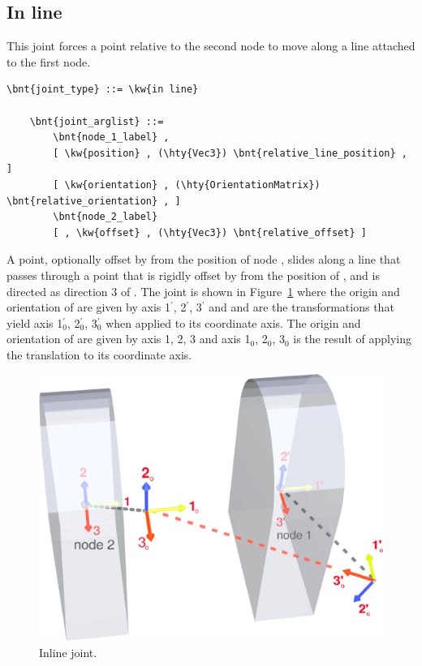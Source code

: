 \subsection{In line}
This joint forces a point relative to the second node to move 
along a line attached to the first node.
\begin{Verbatim}[commandchars=\\\{\}]
    \bnt{joint_type} ::= \kw{in line}

    \bnt{joint_arglist} ::= 
        \bnt{node_1_label} , 
        [ \kw{position} , (\hty{Vec3}) \bnt{relative_line_position} , ]
        [ \kw{orientation} , (\hty{OrientationMatrix}) \bnt{relative_orientation} , ]
        \bnt{node_2_label}
        [ , \kw{offset} , (\hty{Vec3}) \bnt{relative_offset} ]
\end{Verbatim}
A point, optionally offset by  from the position
of node , slides along a line that passes through a point 
that is rigidly offset by 
from the position of , and is directed as direction 3 
of .
The joint is shown in Figure~\ref{fig:el:joint:INLINE} where the origin and orientation of  are given by axis 1$^\prime$, 2$^\prime$, 3$^\prime$ and  and  are the transformations that yield axis 1$^\prime_0$, 2$^\prime_0$, 3$^\prime_0$ when applied to its coordinate axis. The origin and orientation of  are given by axis 1, 2, 3 and axis 1$_0$, 2$_0$, 3$_0$ is the result of applying the  translation to its coordinate axis.
\begin{figure}
\centering
\includegraphics[width=.5\textwidth]{inline}
\caption{Inline joint.}
\label{fig:el:joint:INLINE}
\end{figure}



